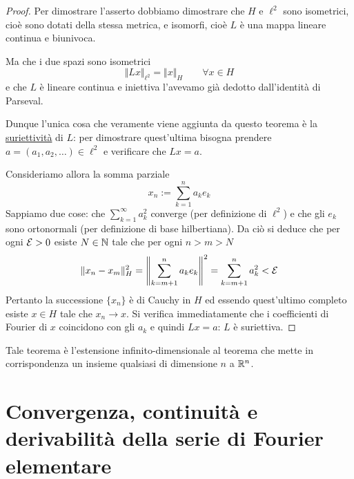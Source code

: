 \begin{proof}
Per dimostrare l'asserto dobbiamo dimostrare che $H$ e $\ell^2$ sono isometrici, cioè sono dotati della stessa metrica, e isomorfi, cioè $L$ è una mappa lineare continua e biunivoca.

Ma che i due spazi sono isometrici
\begin{equation*}
\Vert Lx \Vert_{\ell^2}=\Vert x \Vert_H \qquad \forall x\in H
\end{equation*}
e che $L$ è lineare continua e iniettiva l'avevamo già dedotto dall'identità di Parseval.

Dunque l'unica cosa che veramente viene aggiunta da questo teorema è la \underline{suriettività} di $L$: per dimostrare quest'ultima bisogna prendere $a=(a_1,a_2,\dots)\in\ell^2$ e verificare che $Lx=a$. 

Consideriamo allora la somma parziale
$$
x_n:=\sum_{k=1}^na_ke_k
$$
Sappiamo due cose: che $\sum_{k=1}^\infty a_k^2$ converge (per definizione di $\ell^2$) e che gli $e_k$ sono ortonormali (per definizione di base hilbertiana). Da ciò si deduce che per ogni $\mathcal{E}>0$ esiste $N\in \mathbb{N}$ tale che per ogni $n>m>N$
$$
\Vert x_n-x_m\Vert_H^2=\left\|\sum_{k=m+1}^n a_ke_k\right\|^2=\sum_{k=m+1}^n a_k^2<\mathcal{E}
$$
Pertanto la successione $\{x_n\}$ è di Cauchy in $H$ ed essendo quest'ultimo completo esiste $x\in H$ tale che $x_n\to x$. Si verifica immediatamente che i coefficienti di Fourier di $x$ coincidono con gli $a_k$ e quindi $Lx=a$: $L$ è suriettiva.
\end{proof}

\begin{rem}
Tale teorema è l'estensione infinito-dimensionale al teorema che mette in corrispondenza un insieme qualsiasi di dimensione $n$ a $\mathbb{R}^n$.
\end{rem}


\section{Convergenza, continuità e derivabilità della serie di Fourier elementare}

